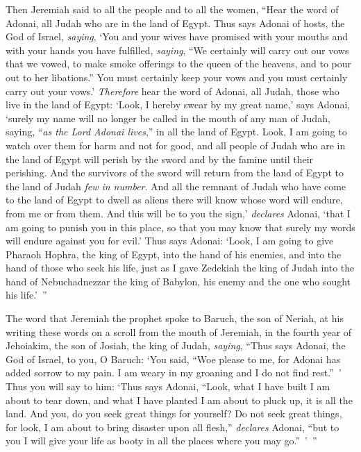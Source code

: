 \begin{biblechapter}
\verse Then Jeremiah said to all the people and to all the women, “Hear the word of Adonai, all Judah who are in the land of Egypt.
\verse Thus says Adonai of hosts, the God of Israel, \textit{saying}, ‘You and your wives have promised with your mouths and with your hands you have fulfilled, \textit{saying}, “We certainly will carry out our vows that we vowed, to make smoke offerings to the queen of the heavens, and to pour out to her libations.” You must certainly keep your vows and you must certainly carry out your vows.’
\verse \textit{Therefore} hear the word of Adonai, all Judah, those who live in the land of Egypt: ‘Look, I hereby swear by my great name,’ says Adonai, ‘surely my name will no longer be called in the mouth of any man of Judah, saying, “\textit{as the Lord Adonai lives},” in all the land of Egypt.
\verse Look, I am going to watch over them for harm and not for good, and all people of Judah who are in the land of Egypt will perish by the sword and by the famine until their perishing.
\verse And the survivors of the sword will return from the land of Egypt to the land of Judah \textit{few in number}. And all the remnant of Judah who have come to the land of Egypt to dwell as aliens there will know whose word will endure, from me or from them.
\verse And this will be to you the sign,’ \textit{declares} Adonai, ‘that I am going to punish you in this place, so that you may know that surely my words will endure against you for evil.’
\verse Thus says Adonai: ‘Look, I am going to give Pharaoh Hophra, the king of Egypt, into the hand of his enemies, and into the hand of those who seek his life, just as I gave Zedekiah the king of Judah into the hand of Nebuchadnezzar the king of Babylon, his enemy and the one who sought his life.’ ”
\end{biblechapter}

\begin{biblechapter} %
 The word that Jeremiah the prophet spoke to Baruch, the son of Neriah, at his writing these words on a scroll from the mouth of Jeremiah, in the fourth year of Jehoiakim, the son of Josiah, the king of Judah, \textit{saying},
\verse “Thus says Adonai, the God of Israel, to you, O Baruch:
\verse ‘You said, “Woe please to me, for Adonai has added sorrow to my pain. I am weary in my groaning and I do not find rest.” ’
\verse Thus you will say to him: ‘Thus says Adonai, “Look, what I have built I am about to tear down, and what I have planted I am about to pluck up, it is all the land.
\verse And you, do you seek great things for yourself? Do not seek great things, for look, I am about to bring disaster upon all flesh,” \textit{declares} Adonai, “but to you I will give your life as booty in all the places where you may go.” ’ ”
\end{biblechapter}

